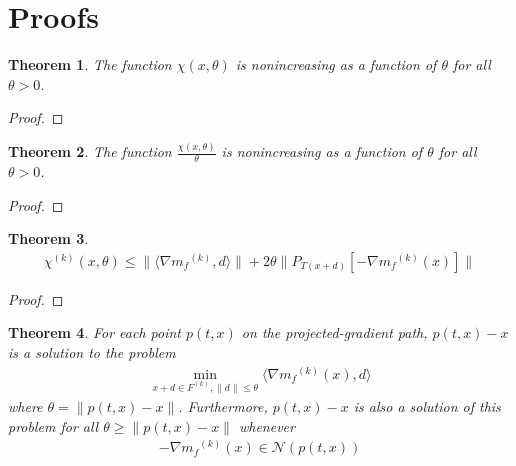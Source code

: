\documentclass{article}
\newtheorem{theorem}{Theorem}[section]
\theoremstyle{case}
\newcommand{\modelk}{{{m}_f}^{(k)}}
\newcommand{\feasiblek}{{F}^{(k)}}
\newcommand{\ptx}{p(t,x)}
\newcommand{\chik}{{\chi^{(k)}}}
\begin{document}
\section{Proofs}

\begin{theorem}
\label{chi_non_inc}
The function $\chi(x,\theta)$ is nonincreasing as a function of $\theta$ for all $\theta>0$.
\end{theorem}

\begin{proof}
\end{proof}

\begin{theorem}
\label{chi_non_inc}
The function $\frac{\chi(x,\theta)}{\theta}$ is nonincreasing as a function of $\theta$ for all $\theta>0$.
\end{theorem}

\begin{proof}
\end{proof}

\begin{theorem}
\begin{align}
\label{12_1_5_3}
\chik(x, \theta) \le \|\langle\nabla \modelk, d\rangle\| + 2\theta \|P_{T(x+d)}[-\nabla\modelk(x)]\|
\end{align}
\end{theorem}

\begin{proof}
\end{proof}


\begin{theorem}
\label{12_1_4}
For each point $\ptx$ on the projected-gradient path, $\ptx-x$ is a solution to the problem
\begin{align}
\label{12_1_8}
\min_{x+d\in \feasiblek, \|d\| \le \theta} \langle \nabla \modelk(x), d\rangle
\end{align}
where $\theta = \|\ptx - x\|$.
Furthermore, $\ptx - x$ is also a solution of this problem for all $\theta \ge \|\ptx - x\|$ whenever
\begin{align}
\label{12_1_9}
-\nabla \modelk(x) \in \mathcal N(\ptx)
\end{align}
\end{theorem}
\end{document}
